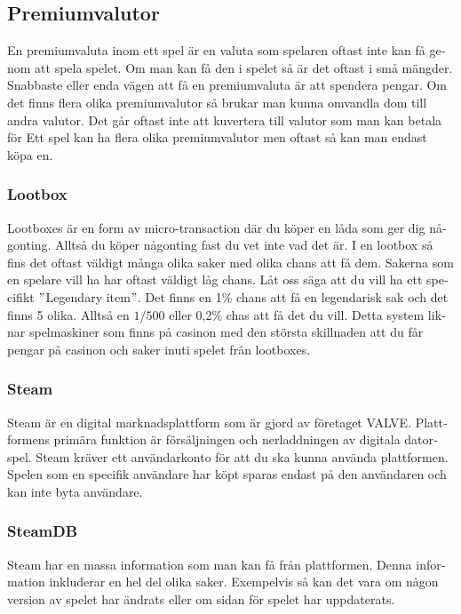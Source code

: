 \documentclass[11p]{article}
\begin{document}
\begin{otherlanguage}{swedish}
    \subsection{Premiumvalutor}
    En premiumvaluta inom ett spel är en valuta som spelaren oftast inte kan få genom att spela spelet.
    Om man kan få den i spelet så är det oftast i små mängder.
    Snabbaste eller enda vägen att få en premiumvaluta är att spendera pengar.
    Om det finns flera olika premiumvalutor så brukar man kunna omvandla dom till andra valutor.
    Det går oftast inte att kuvertera till valutor som man kan betala för
    Ett spel kan ha flera olika premiumvalutor men oftast så kan man endast köpa en.


    \subsubsection{Lootbox}
    Lootboxes är en form av micro-transaction där du köper en låda som ger dig någonting.
    Alltså du köper någonting fast du vet inte vad det är.
    I en lootbox så fins det oftast väldigt många olika saker med olika chans att få dem.
    Sakerna som en spelare vill ha har oftast väldigt låg chans.
    Låt oss säga att du vill ha ett specifikt \("\)Legendary item\("\).
    Det finns en 1\% chans att få en legendarisk sak och det finns 5 olika.
    Alltså en \(1/500\) eller 0,2\% chas att få det du vill.
    Detta system liknar spelmaskiner som finns på casinon med den största skillnaden att du får pengar på casinon och saker inuti spelet från lootboxes.

    \subsubsection{Steam}
    Steam är en digital marknadsplattform som är gjord av företaget VALVE.
    Plattformens primära funktion är försäljningen och nerladdningen av digitala datorspel.
    Steam kräver ett användarkonto för att du ska kunna använda plattformen.
    Spelen som en specifik användare har köpt sparas endast på den användaren och kan inte byta användare.


    \subsubsection{SteamDB}
    Steam har en massa information som man kan få från plattformen.
    Denna information inkluderar en hel del olika saker.
    Exempelvis så kan det vara om någon version av spelet har ändrats eller om sidan för spelet har uppdaterats.


\end{otherlanguage}
\end{document}
